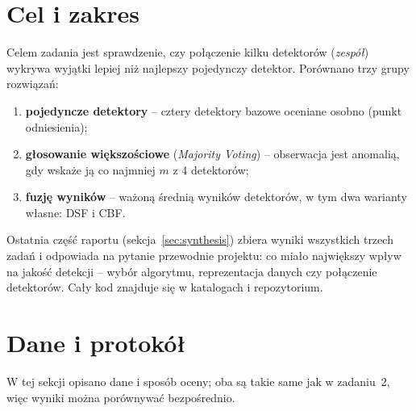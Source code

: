 \documentclass[11pt,a4paper]{article}
\begin{document}
\tableofcontents
\newpage

\section{Cel i zakres}

Celem zadania jest sprawdzenie, czy połączenie kilku detektorów
(\emph{zespół}) wykrywa wyjątki lepiej niż najlepszy pojedynczy detektor.
Porównano trzy grupy rozwiązań:
\begin{enumerate}
  \item \textbf{pojedyncze detektory} -- cztery detektory bazowe oceniane
  osobno (punkt odniesienia);
  \item \textbf{głosowanie większościowe} (\emph{Majority Voting}) --
  obserwacja jest anomalią, gdy wskaże ją co najmniej $m$ z 4 detektorów;
  \item \textbf{fuzję wyników} -- ważoną średnią wyników detektorów, w tym
  dwa warianty własne: DSF i CBF.
\end{enumerate}
Ostatnia część raportu (sekcja~\ref{sec:synthesis}) zbiera wyniki
wszystkich trzech zadań i odpowiada na pytanie przewodnie projektu: co miało
największy wpływ na jakość detekcji -- wybór algorytmu, reprezentacja danych
czy połączenie detektorów. Cały kod znajduje się w katalogach 
i  repozytorium.

\FloatBarrier
\section{Dane i protokół}
\label{sec:protocol}

W tej sekcji opisano dane i sposób oceny; oba są takie same jak w zadaniu~2,
więc wyniki można porównywać bezpośrednio.

\begin{table}[H]
  \centering\small
  \caption{Zbiory danych (te same co w zadaniu~2; opis i przykładowe rekordy
  -- raport z zadania~2).}
  \label{tab:datasets}
\end{table}
\end{document}

